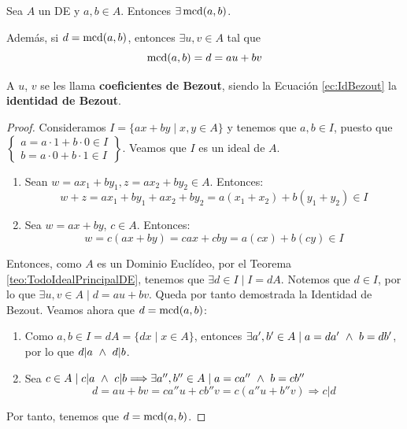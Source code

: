 \begin{coro} \label{cor:DEExistemcdyBezout}
    Sea $A$ un DE y $a,b \in A$. Entonces $\exists \operatorname{mcd}(a,b)$.
    
    Además, si $d=\operatorname{mcd}(a,b)$, entonces $\exists u,v \in A$ tal que
    \begin{equation}\label{ec:IdBezout}
        \operatorname{mcd}(a,b) = d = au + bv
    \end{equation}
    
    A $u$, $v$ se les llama \textbf{coeficientes de Bezout}, siendo la Ecuación \ref{ec:IdBezout} la \textbf{identidad de Bezout}.
\end{coro}
\begin{proof}
    Consideramos $I = \{ax+by \mid x,y \in A\}$ y tenemos que $a, b\in I$, puesto que $\left\{\begin{array}{l}
         a = a\cdot 1 + b \cdot 0 \in I \\
         b = a\cdot 0 + b \cdot 1 \in I
    \end{array}\right\}$. Veamos que $I$ es un ideal de $A$.
    \begin{enumerate}
        \item Sean $w=ax_1 +by_1, z=ax_2+by_2\in A$. Entonces:
        $$ w+z = ax_1 + by_1 + ax_2 + by_2 = a(x_1 + x_2) + b(y_1+y_2) \in I$$

        \item Sea $w=ax+by$, $c \in A$. Entonces:
        $$w = c(ax+by) = cax + cby = a(cx) + b(cy) \in I$$
    \end{enumerate}
    
    Entonces, como $A$ es un Dominio Euclídeo, por el Teorema \ref{teo:TodoIdealPrincipalDE}, tenemos que $\exists d \in I \mid I = dA$.
    Notemos que $d\in I$, por lo que $\exists u,v \in A \mid d=au+bv$. Queda por tanto demostrada la Identidad de Bezout. Veamos ahora que $d=\operatorname{mcd}(a,b)$:
    \begin{enumerate}
        \item Como $a,b \in I =dA = \{dx \mid x \in A\}$, entonces $\exists a', b' \in A \mid a=da' \ \land \  b=db'$, por lo que $d|a \ \land \  d|b$.

        \item Sea $c \in A \mid c|a \ \land \  c|b \Longrightarrow \exists a'', b'' \in A \mid a=ca'' \ \land \  b=cb''$
        $$d=au+bv = ca''u + cb''v = c(a'' u + b''v) \Longrightarrow c|d$$  
    \end{enumerate}
    
    Por tanto, tenemos que $d = \operatorname{mcd}(a,b)$.
\end{proof}

